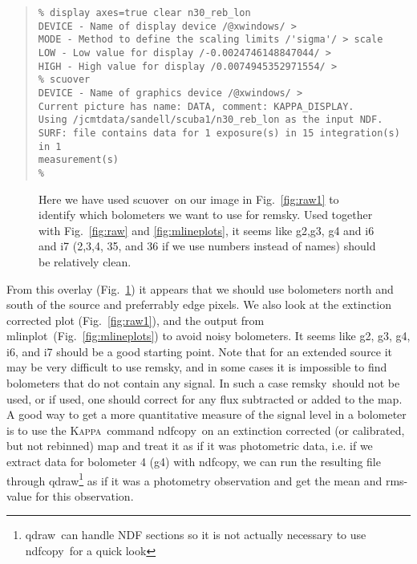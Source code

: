 \documentclass[twoside,11pt]{article}
\newenvironment{myquote}{\begin{quote}\begin{small}}{\end{small}\end{quote}}
\newcommand{\Kappa}{\xref{\textsc{Kappa}}{sun95}{}}
\newcommand{\task}[1]{\textsf{#1}}
\newcommand{\remsky}{\xref{\task{remsky}}{sun216}{REMSKY}}
\newcommand{\scuover}{\xref{\task{scuover}}{sun216}{SCUOVER}}
\newcommand{\qdraw}{\xref{\task{qdraw}}{sun216}{QDRAW}}
\newcommand{\mlinplot}{\xref{\task{mlinplot}}{sun95}{MLINPLOT}}
\newcommand{\ndfcopy}{\xref{\task{ndfcopy}}{sun95}{NDFCOPY}}
\newcommand{\xref}[3]{#1}
\begin{document}
\begin{myquote} \begin{verbatim}
% display axes=true clear n30_reb_lon
DEVICE - Name of display device /@xwindows/ > 
MODE - Method to define the scaling limits /'sigma'/ > scale
LOW - Low value for display /-0.0024746148847044/ > 
HIGH - High value for display /0.0074945352971554/ > 
% scuover
DEVICE - Name of graphics device /@xwindows/ > 
Current picture has name: DATA, comment: KAPPA_DISPLAY.
Using /jcmtdata/sandell/scuba1/n30_reb_lon as the input NDF.
SURF: file contains data for 1 exposure(s) in 15 integration(s) in 1
measurement(s)
%
\end{verbatim} \end{myquote}

\begin{figure}
\begin{center}
\caption{Here we have used \scuover\ on our image in Fig.\ \ref{fig:raw1} to 
identify which bolometers we want to use for \remsky. Used together with Fig.\
\ref{fig:raw} and \ref{fig:mlineplots}, it seems like g2,g3, g4 and i6 and i7
(2,3,4, 35, and 36 if we use numbers instead of names) should be relatively
clean.}
\label{fig:scuover}
\end{center}
\end{figure}


From this overlay (Fig.\ \ref{fig:scuover}) it appears that we should use
bolometers north and south of the source and preferrably edge pixels. We also
look at the extinction corrected plot (Fig.\ \ref{fig:raw1}), and the output
from \mlinplot\ (Fig.\ \ref{fig:mlineplots}) to avoid noisy bolometers. It
seems like g2, g3, g4, i6, and i7 should be a good starting point. Note that
for an extended source it may be very difficult to use \remsky, and in some
cases it is impossible to find bolometers that do not contain any signal. In
such a case \remsky\ should not be used, or if used, one should correct for
any flux subtracted or added to the map. A good way to get a more quantitative
measure of the signal level in a bolometer is to use the \Kappa\ command
\ndfcopy\ on an extinction corrected (or calibrated, but not rebinned)
map and treat it as if it was photometric data, i.e. if we extract data for
bolometer 4 (g4) with \ndfcopy, we can run the resulting file through
\qdraw\footnote{\qdraw\ can handle NDF sections so it is not actually
necessary to use \ndfcopy\ for a quick look} as if it was a photometry
observation and get the mean and rms-value for this observation.
\end{document}
